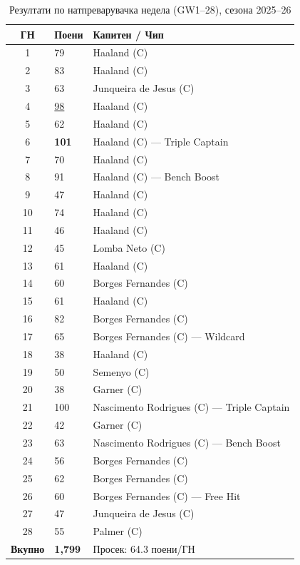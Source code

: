 \begin{table}[h]
\centering
\caption{Резултати по натпреварувачка недела (GW1--28), сезона 2025--26}
\label{tab:gw_results_mk}
\begin{tabular}{clp{6.5cm}}
\toprule
\textbf{ГН} & \textbf{Поени} & \textbf{Капитен / Чип} \\
\midrule
1  & 79  & Haaland (C) \\
2  & 83  & Haaland (C) \\
3  & 63  & Junqueira de Jesus (C) \\
4  & \underline{98}  & Haaland (C) \\
5  & 62  & Haaland (C) \\
6  & \textbf{101} & Haaland (C) — Triple Captain \\
7  & 70  & Haaland (C) \\
8  & 91  & Haaland (C) — Bench Boost \\
9  & 47  & Haaland (C) \\
10 & 74  & Haaland (C) \\
11 & 46  & Haaland (C) \\
12 & 45  & Lomba Neto (C) \\
13 & 61  & Haaland (C) \\
14 & 60  & Borges Fernandes (C) \\
15 & 61  & Haaland (C) \\
16 & 82  & Borges Fernandes (C) \\
17 & 65  & Borges Fernandes (C) — Wildcard \\
18 & 38  & Haaland (C) \\
19 & 50  & Semenyo (C) \\
20 & 38  & Garner (C) \\
21 & 100 & Nascimento Rodrigues (C) — Triple Captain \\
22 & 42  & Garner (C) \\
23 & 63  & Nascimento Rodrigues (C) — Bench Boost \\
24 & 56  & Borges Fernandes (C) \\
25 & 62  & Borges Fernandes (C) \\
26 & 60  & Borges Fernandes (C) — Free Hit \\
27 & 47  & Junqueira de Jesus (C) \\
28 & 55  & Palmer (C) \\
\midrule
\textbf{Вкупно} & \textbf{1{,}799} & Просек: 64.3 поени/ГН \\
\bottomrule
\end{tabular}
\end{table}

